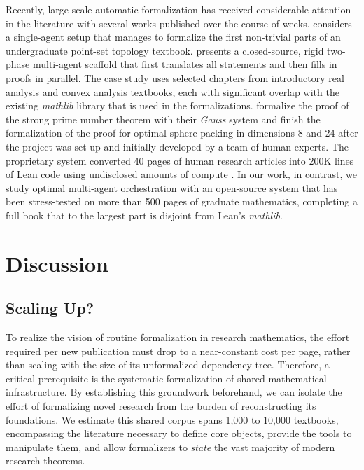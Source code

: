 \documentclass[]{fairmeta}
\begin{document}
Recently, large-scale automatic formalization has received considerable attention in the literature with several works published over the course of weeks.
\citet{urban2026130klinesformaltopology} considers a single-agent setup that manages to formalize the first non-trivial parts of an undergraduate point-set topology textbook.
\citet{wang2026m2fautomatedformalizationmathematical} presents a closed-source, rigid two-phase multi-agent scaffold that first translates all statements and then fills in proofs in parallel. The case study uses selected chapters from introductory real analysis and convex analysis textbooks, each with significant overlap with the existing \emph{mathlib} library that is used in the formalizations.
\citet{mathinc2025gauss} formalize the proof of the strong prime number theorem with their \emph{Gauss} system and finish the formalization of the proof for optimal sphere packing in dimensions 8 and 24 after the project was set up and initially developed by a team of human experts. The proprietary system converted 40 pages of human research articles into 200K lines of Lean code using undisclosed amounts of compute \citep{mathinc2026sphere}.
In our work, in contrast, we study optimal multi-agent orchestration with an open-source system that has been stress-tested on more than 500 pages of graduate mathematics, completing a full book that to the largest part is disjoint from Lean's \emph{mathlib}.

\section{Discussion}

\subsection{Scaling Up?}
To realize the vision of routine formalization in research mathematics, the effort required per new publication must drop to a near-constant cost per page, rather than scaling with the size of its unformalized dependency tree.
Therefore, a critical prerequisite is the systematic formalization of shared mathematical infrastructure.
By establishing this groundwork beforehand, we can isolate the effort of formalizing novel research from the burden of reconstructing its foundations.
We estimate this shared corpus spans 1,000 to 10,000 textbooks, encompassing the literature necessary to define core objects, provide the tools to manipulate them, and allow formalizers to \emph{state} the vast majority of modern research theorems.
\end{document}
